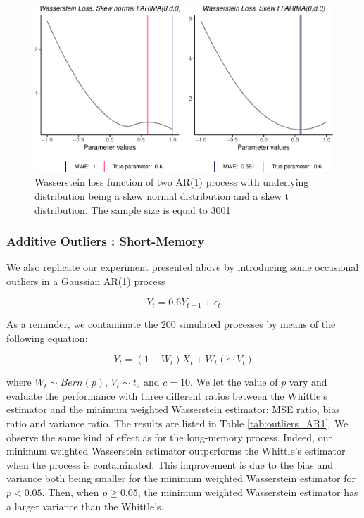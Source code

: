 \documentclass[
  11pt,
]{article}
\begin{document}
\begin{figure}

{\centering \includegraphics[width=0.75\linewidth]{Master_thesis_V4_files/figure-latex/AR1_loss-1} 

}

\caption{Wasserstein loss function of two AR(1) process with underlying distribution being a skew normal distribution and a skew t distribution. The sample size is equal to 3001}\label{fig:AR1_loss}
\end{figure}

\hypertarget{additive-outliers-short-memory}{%
\subsubsection{Additive Outliers :
Short-Memory}\label{additive-outliers-short-memory}}

We also replicate our experiment presented above by introducing some
occasional outliers in a Gaussian AR(1) process

\[Y_t = 0.6Y_{t-1} + \epsilon_t\]

As a reminder, we contaminate the \(200\) simulated processes by means
of the following equation:

\[Y_{t}=\left(1-W_{t}\right) X_{t}+W_{t}\left(c \cdot V_{t}\right)\]

where \(W_t \sim Bern(p)\), \(V_t \sim t_2\) and \(c = 10\). We let the
value of \(p\) vary and evaluate the performance with three different
ratios between the Whittle's estimator and the minimum weighted
Wasserstein estimator: MSE ratio, bias ratio and variance ratio. The
results are listed in Table \ref{tab:outliers_AR1}. We observe the same
kind of effect as for the long-memory process. Indeed, our minimum
weighted Wasserstein estimator outperforms the Whittle's estimator when
the process is contaminated. This improvement is due to the bias and
variance both being smaller for the minimum weighted Wasserstein
estimator for \(p <0.05\). Then, when \(p \geq 0.05\), the minimum
weighted Wasserstein estimator has a larger variance than the Whittle's.
\end{document}
